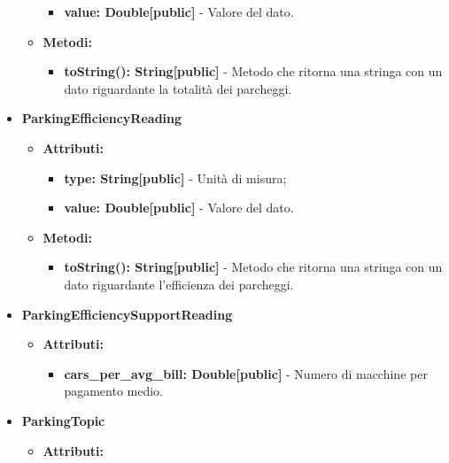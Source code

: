 \documentclass[8pt]{article}
\begin{document}
\begin{itemize}
\begin{itemize}
\begin{itemize}
            \item \textbf{value: Double[public]} - Valore del dato.
        \end{itemize}
    \end{itemize}
    \begin{itemize}
        \item \textbf{Metodi:}
        \begin{itemize}
            \item \textbf{toString(): String[public]} - Metodo che ritorna una stringa con un dato riguardante la totalità dei parcheggi.
        \end{itemize}
    \end{itemize}
    \item \textbf{ParkingEfficiencyReading}
    \begin{itemize}
        \item \textbf{Attributi:}
        \begin{itemize}
            \item \textbf{type: String[public]} - Unità di misura;
            \item \textbf{value: Double[public]} - Valore del dato.
        \end{itemize}
    \end{itemize}
    \begin{itemize}
        \item \textbf{Metodi:}
        \begin{itemize}
            \item \textbf{toString(): String[public]} - Metodo che ritorna una stringa con un dato riguardante l'efficienza dei parcheggi.
        \end{itemize}
    \end{itemize}
    \item \textbf{ParkingEfficiencySupportReading}
    \begin{itemize}
        \item \textbf{Attributi:}
        \begin{itemize}
            \item \textbf{cars\_per\_avg\_bill: Double[public]} - Numero di macchine per pagamento medio.
        \end{itemize}
    \end{itemize}
    \item \textbf{ParkingTopic}
    \begin{itemize}
        \item \textbf{Attributi:}
        \begin{itemize}

\end{itemize}
\end{itemize}
\end{itemize}
\end{document}
